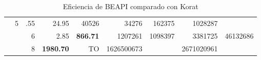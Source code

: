 \begin{table}[H]
\begin{center}
\begin{tabular}{clr|rr|rr|rr}
    &   5   &   .55     & 24.95	 & 40526 & 34276 & 162375   &1028287\\

&	&	6	&	2.85	& \textbf{866.71} &	1207261	& 1098397 &	3381725	&	46132686	\\
&	&	8	&	\textbf{1980.70}	& TO &	1626500673	& &	2671020961	&		\\
\bottomrule

\end{tabular}%
\end{center}
\caption{Eficiencia de BEAPI comparado con Korat}

\label{table:korat-beapi}

\end{table}

 
